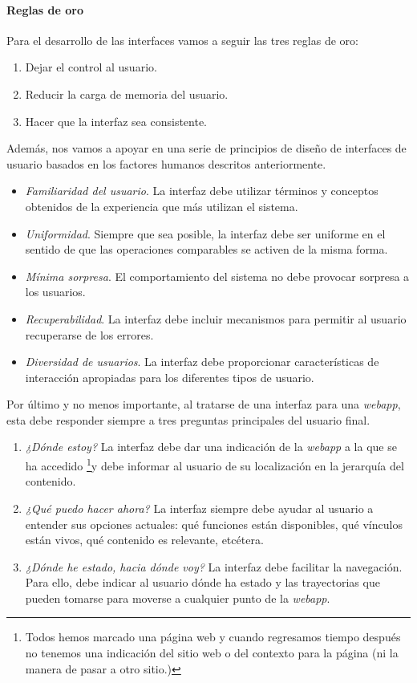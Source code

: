 	\paragraph{Reglas de oro} %
	\label{par:reglas_de_oro}
	
	Para el desarrollo de las interfaces vamos a seguir las tres reglas de oro:
	\begin{enumerate}
		\item Dejar el control al usuario.
		\item Reducir la carga de memoria del usuario.
		\item Hacer que la interfaz sea consistente.
	\end{enumerate}
	
	Además, nos vamos a apoyar en una serie de principios de diseño de interfaces de usuario basados en los factores humanos descritos anteriormente. 
	\begin{itemize}
		\item \textit{Familiaridad del usuario}. La interfaz debe utilizar términos y conceptos obtenidos de la experiencia que más utilizan el sistema.
		\item \textit{Uniformidad}. Siempre que sea posible, la interfaz debe ser uniforme en el sentido de que las operaciones comparables se activen de la misma forma.
		\item \textit{Mínima sorpresa}. El comportamiento del sistema no debe provocar sorpresa a los usuarios.
		\item \textit{Recuperabilidad}. La interfaz debe incluir mecanismos para permitir al usuario recuperarse de los errores.
		\item \textit{Diversidad de usuarios}. La interfaz debe proporcionar características de interacción apropiadas para los diferentes tipos de usuario.
	\end{itemize}
	
	Por último y no menos importante, al tratarse de una interfaz para una \textit{webapp}, esta debe responder siempre a tres preguntas principales del usuario final.
	\begin{enumerate}
		\item \textit{¿Dónde estoy?} La interfaz debe dar una indicación de la \textit{webapp} a la que se ha accedido \footnote{Todos hemos marcado una página web y cuando regresamos tiempo después no tenemos una indicación del sitio web o del contexto para la página (ni la manera de pasar a otro sitio.)}y debe informar al usuario de su localización en la jerarquía del contenido.
		\item \textit{¿Qué puedo hacer ahora?} La interfaz siempre debe ayudar al usuario a entender sus opciones actuales: qué funciones están disponibles, qué vínculos están vivos, qué contenido es relevante, etcétera.
		\item \textit{¿Dónde he estado, hacia dónde voy?} La interfaz debe facilitar la navegación. Para ello, debe indicar al usuario dónde ha estado y las trayectorias que pueden tomarse para moverse a cualquier punto de la \textit{webapp}.
	\end{enumerate}
	
